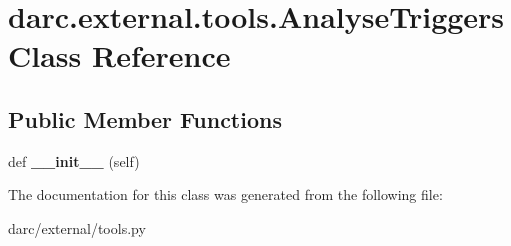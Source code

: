 \hypertarget{classdarc_1_1external_1_1tools_1_1_analyse_triggers}{}\section{darc.\+external.\+tools.\+Analyse\+Triggers Class Reference}
\label{classdarc_1_1external_1_1tools_1_1_analyse_triggers}
\subsection*{Public Member Functions}
\begin{DoxyCompactItemize}
\item 
\mbox{\label{classdarc_1_1external_1_1tools_1_1_analyse_triggers_a40091f376378f8e9b0799938da557315}} 
def {\bfseries \+\_\+\+\_\+init\+\_\+\+\_\+} (self)
\end{DoxyCompactItemize}


The documentation for this class was generated from the following file\+:\begin{DoxyCompactItemize}
\item 
darc/external/tools.\+py\end{DoxyCompactItemize}
